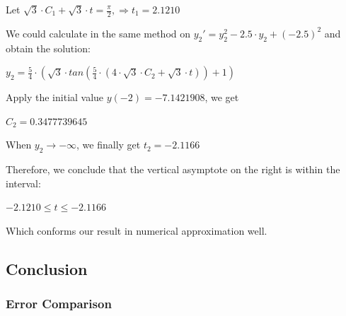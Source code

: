 \documentclass[11pt,a4paper]{article}
\begin{document}
	\begin{center}
		Let $\sqrt{3} \cdot C_1+\sqrt{3} \cdot t=\frac{\pi}{2}, \Rightarrow t_1 = 2.1210$
	\end{center}

	We could calculate in the same method on $y_2' = y_2 ^ 2-2.5 \cdot y_2+(-2.5)^2$ and obtain the solution:

	\begin{center}
		$y_2=\frac{5}{4} \cdot (\sqrt{3} \cdot tan(\frac{5}{4} \cdot (4 \cdot \sqrt{3} \cdot C_2+\sqrt{3} \cdot t))+1)$
	\end{center}

	 Apply the initial value $y(-2) = -7.1421908$, we get 
	\begin{center}
		$C_2 = 0.3477739645$
	\end{center}

	When $y_2 \rightarrow -\infty$, we finally get $t_2=-2.1166$

	Therefore, we conclude that the vertical asymptote on the right is within the interval:

	\begin{center}
		$-2.1210 \leq t \leq -2.1166$
	\end{center}

	Which conforms our result in numerical approximation well.

\subsection{Conclusion}

\subsubsection{Error Comparison}
 
\end{document}
